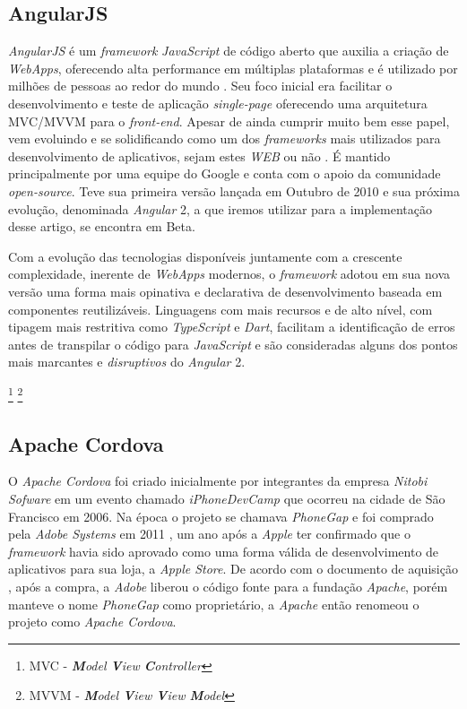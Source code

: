 \subsection{\esp AngularJS}
\textit{AngularJS} é um \textit{framework} \textit{JavaScript} de código aberto que auxilia a criação de \textit{WebApps}, oferecendo alta performance em múltiplas plataformas e é utilizado por milhões de pessoas ao redor do mundo \cite{angularjs}. Seu foco inicial era facilitar o desenvolvimento e teste de aplicação \textit{single-page} oferecendo uma arquitetura \symbolfootnote[1]MVC/\symbolfootnote[2]MVVM para o \textit{front-end}. Apesar de ainda cumprir muito bem esse papel, vem evoluindo e se solidificando como um dos \textit{frameworks} mais utilizados para desenvolvimento de aplicativos, sejam estes \textit{WEB} ou não \cite{angularjs}. É mantido principalmente por uma equipe do Google e conta com o apoio da comunidade \textit{open-source}. Teve sua primeira versão lançada em Outubro de 2010 e sua próxima evolução, denominada \textit{Angular} 2, a que iremos utilizar para a implementação desse artigo, se encontra em Beta.  

Com a evolução das tecnologias disponíveis juntamente com a crescente complexidade, inerente de \textit{WebApps} modernos, o \textit{framework} adotou em sua nova versão uma forma mais opinativa e declarativa de desenvolvimento baseada em componentes reutilizáveis. Linguagens com mais recursos e de alto nível, com tipagem mais restritiva como \textit{TypeScript} e \textit{Dart}, facilitam a identificação de erros antes de transpilar o código para \textit{JavaScript} e são consideradas alguns dos pontos mais marcantes e \textit{disruptivos} do \textit{Angular} 2.

\footnote{MVC - \textit{\textbf{M}odel \textbf{V}iew \textbf{C}ontroller}}
\footnote{MVVM - \textit{\textbf{M}odel \textbf{V}iew \textbf{V}iew \textbf{M}odel}}

\subsection{\esp Apache Cordova}

O \textit{Apache Cordova} foi criado inicialmente por integrantes da empresa \textit{Nitobi Sofware} em um evento chamado \textit{iPhoneDevCamp} que ocorreu na cidade de São Francisco em 2006. Na época o projeto se chamava \textit{PhoneGap} e foi comprado pela \textit{Adobe Systems} em 2011 \cite{Adobe2011}, um ano após a \textit{Apple} ter confirmado que o \textit{framework} havia sido aprovado como uma forma válida de desenvolvimento de aplicativos para sua loja, a \textit{Apple Store}. De acordo com o documento de aquisição \cite{Adobe2011}, após a compra, a \textit{Adobe} liberou o código fonte para a fundação \textit{Apache}, porém manteve o nome \textit{PhoneGap} como proprietário, a \textit{Apache} então renomeou o projeto como \textit{Apache Cordova}.

